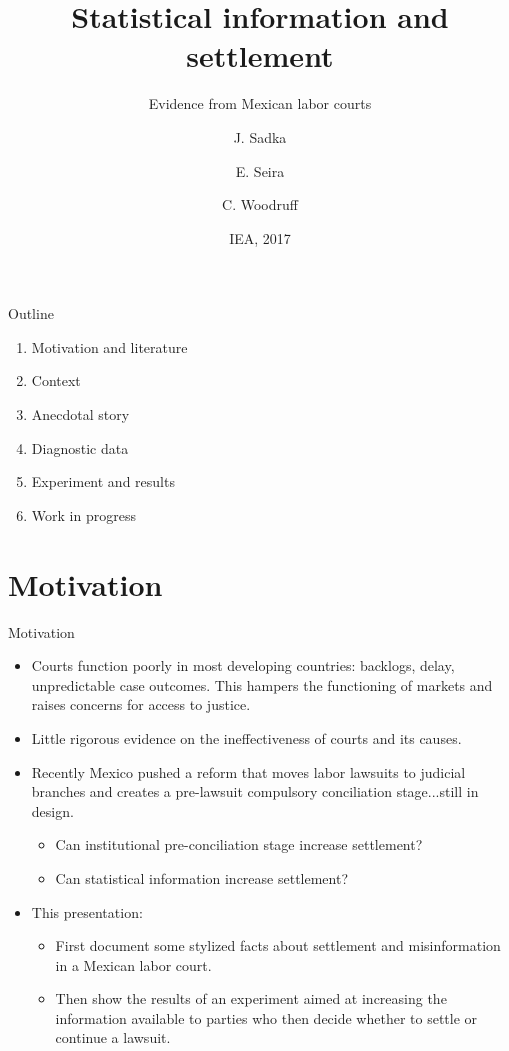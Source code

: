 \documentclass[9pt]{beamer}
\title{Statistical information and settlement}
\subtitle{Evidence from Mexican labor courts}
\author{J. Sadka\inst{1} \and E. Seira\inst{2} \and C. Woodruff\inst{3}}
\institute[ITAM, Oxford] %
{
  \inst{1,2}%
  ITAM
  \and
  \inst{3}%
  Oxford
}
\date{IEA, 2017}
\begin{document}
\begin{frame}
  \titlepage
\end{frame}

\begin{frame}{Outline}
  \begin{enumerate}
      \item Motivation and literature
      \item Context
      \item Anecdotal story
      \item Diagnostic data
      \item Experiment and results
      \item Work in progress
  \end{enumerate}
\end{frame}



\section{Motivation}

\begin{frame}{Motivation}{}
  \begin{itemize}
  \item {Courts function poorly in most developing countries: backlogs, delay, unpredictable case outcomes. This hampers the functioning of markets and raises concerns for access to justice.}
  \vspace{.1in}
  \item {Little rigorous evidence on the ineffectiveness of courts and its causes.}
  \vspace{.1in}
  \item{Recently Mexico pushed a \alert{reform that moves labor lawsuits to judicial branches and creates a pre-lawsuit compulsory conciliation stage}...still in design.}
  \vspace{.05in}
    \begin{itemize}
        \item Can institutional pre-conciliation stage increase settlement?
          \vspace{.05in}
        \item Can statistical information increase settlement?
    \end{itemize}
    \vspace{.1in}
    \item {This presentation:}
       \begin{itemize}
           \item First document some \alert{stylized facts} about settlement and misinformation in a Mexican labor court.
           \item Then show the results of an \alert{experiment} aimed at increasing the information available to parties who then decide whether to settle or continue a lawsuit.
       \end{itemize}
  \end{itemize}
\end{frame}
                  
\end{document}
